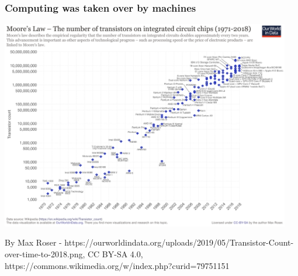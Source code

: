 \begin{frame}\frametitle{Computing was taken over by machines}

  \begin{center}
    \includegraphics[width=0.95\textwidth]{pic/moore.png}
    \vspace{-0.15cm}

    {\tiny By Max Roser - https://ourworldindata.org/uploads/2019/05/Transistor-Count-over-time-to-2018.png, CC BY-SA 4.0, https://commons.wikimedia.org/w/index.php?curid=79751151}
  \end{center}

\end{frame}

